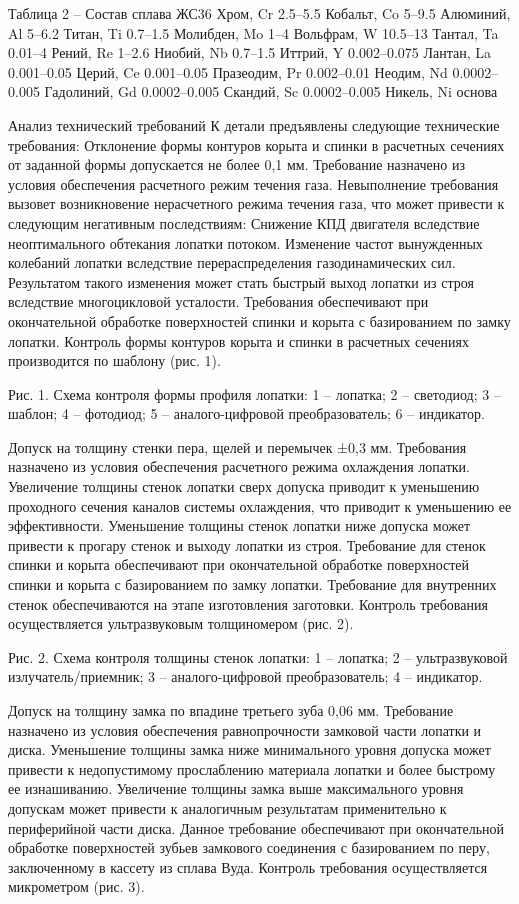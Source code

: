Таблица 2 – Состав сплава ЖС36
Хром, Cr
2.5–5.5
Кобальт, Co
5–9.5
Алюминий, Al
5–6.2
Титан, Ti
0.7–1.5
Молибден, Mo
1–4
Вольфрам, W
10.5–13
Тантал, Ta
0.01–4
Рений, Re
1–2.6
Ниобий, Nb
0.7–1.5
Иттрий, Y
0.002–0.075
Лантан, La
0.001–0.05
Церий, Ce
0.001–0.05
Празеодим, Pr
0.002–0.01
Неодим, Nd
0.0002–0.005
Гадолиний, Gd
0.0002–0.005
Скандий, Sc
0.0002–0.005
Никель, Ni
основа

Анализ технический требований
К детали предъявлены следующие технические требования:
Отклонение формы контуров корыта и спинки в расчетных сечениях от заданной формы допускается не более 0,1 мм.
Требование назначено из условия обеспечения расчетного режим течения газа.
Невыполнение требования вызовет возникновение нерасчетного режима течения газа, что может привести к следующим негативным последствиям:
Снижение КПД двигателя вследствие неоптимального обтекания лопатки потоком.
Изменение частот вынужденных колебаний лопатки вследствие перераспределения газодинамических сил. Результатом такого изменения может стать быстрый выход лопатки из строя вследствие многоцикловой усталости.
Требования обеспечивают при окончательной обработке поверхностей спинки и корыта с базированием по замку лопатки.
Контроль формы контуров корыта и спинки в расчетных сечениях производится по шаблону (рис. 1).

Рис. 1. Схема контроля формы профиля лопатки: 1 – лопатка; 2 – светодиод; 3 – шаблон; 4 – фотодиод; 5 – аналого-цифровой преобразователь; 6 – индикатор.

Допуск на  толщину стенки пера, щелей и перемычек ±0,3 мм.
Требования назначено из условия обеспечения расчетного режима охлаждения лопатки.
Увеличение толщины стенок лопатки сверх допуска приводит к уменьшению проходного сечения каналов системы охлаждения, что приводит к уменьшению ее эффективности.
Уменьшение толщины стенок лопатки ниже допуска может привести к прогару стенок и выходу лопатки из строя.
Требование для стенок спинки и корыта обеспечивают при окончательной обработке поверхностей спинки и корыта с базированием по замку лопатки. Требование для внутренних стенок обеспечиваются на этапе изготовления заготовки.
Контроль требования осуществляется ультразвуковым толщиномером (рис. 2).

Рис. 2. Схема контроля толщины стенок лопатки: 1 – лопатка; 2 – ультразвуковой излучатель/приемник; 3 – аналого-цифровой преобразователь; 4 – индикатор.

Допуск на толщину замка по впадине третьего зуба 0,06 мм.
Требование назначено из условия обеспечения равнопрочности замковой части лопатки и диска.
Уменьшение толщины замка ниже минимального уровня допуска может привести к недопустимому прослаблению материала лопатки и более быстрому ее изнашиванию. Увеличение толщины замка выше максимального уровня допускам может привести к аналогичным результатам применительно к периферийной части диска.
Данное требование обеспечивают при окончательной обработке поверхностей зубьев замкового соединения с базированием по перу, заключенному в кассету из сплава Вуда.
Контроль требования осуществляется микрометром (рис. 3).

